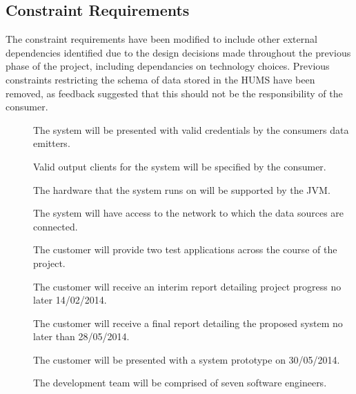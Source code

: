 \subsection{Constraint Requirements}
The constraint requirements have been modified to include other external dependencies identified due to the design decisions made throughout the previous phase of the project, including dependancies on technology choices. Previous constraints restricting the schema of data stored in the HUMS have been removed, as feedback suggested that this should not be the responsibility of the consumer.
\begin{description}
	\item[]  The system will be presented with valid credentials 	by the consumers data emitters.
	\item[]  Valid output clients for the system will be specified 		by the consumer.	
	\item[]  The hardware that the system runs on will be 			supported by the JVM.
	\item[]  The system will have access to the network to which 	the data sources are connected.
	\item[]  The customer will provide two test applications 		across the course of the project.
	\item[]  The customer will receive an interim report detailing 	project progress no later 14/02/2014.
	\item[] The customer will receive a final report detailing the 	proposed system no later than 28/05/2014. 
	\item[]  The customer will be presented with a system 		prototype on 30/05/2014.
	\item[] The development team will be comprised of seven 		software engineers.
\end{description}

